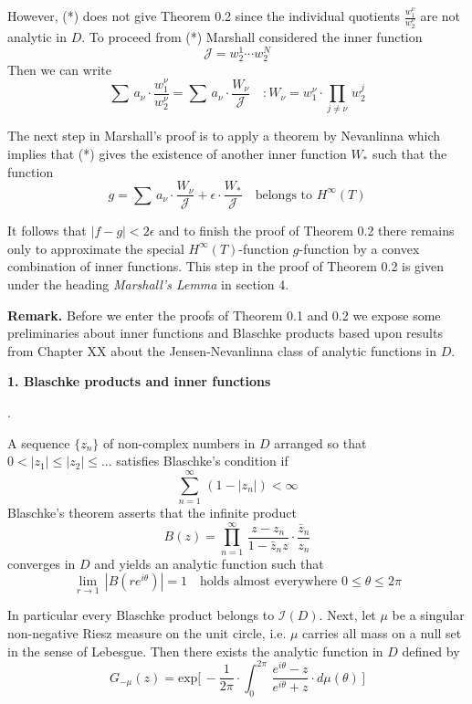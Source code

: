 \documentclass{amsart}
\def\vvv{-}
\begin{document}
\noindent
However,  (*) does not give Theorem 0.2
since the individual 
quotients $\frac{w_1^\nu}{w_2^\nu}$ are not analytic in $D$.
To proceed from (*) 
Marshall 
considered the inner function
\[ 
\mathcal J=w_2^1\cdots w_2^N
\]
Then we can write
\[
\sum\, a_\nu\cdot \frac{w_1^\nu}{w_2^\nu}=
\sum\, a_\nu\cdot \frac{W_\nu}{\mathcal J}\quad\colon
W_\nu=w_1^\nu\cdot\prod_{j\neq\nu}\, w_2^j\tag{**}
\]
\medskip

\noindent
The next step in Marshall's proof is to 
apply a theorem by Nevanlinna which implies that
(*)  gives the existence of another inner
function
$W_*$ such that the function 
\[
g=\sum\, a_\nu\cdot \frac{W_\nu}{\mathcal J}+
\epsilon\cdot\frac{W_*}{\mathcal J}\quad\text{belongs to}\,\, H^\infty(T)\tag{***}
\]


\noindent
It follows that
$\bigl|f-g\bigr|<2\epsilon$ and  to finish the proof
of Theorem 0.2 there  remains only to approximate the 
special $H^\infty(T)$-function
$g$-function by a convex combination 
of inner functions. This  step in  the proof of Theorem 0.2 
is given  under the heading \emph{Marshall's Lemma} in section 4.
\medskip

\noindent
{\bf Remark.} Before we enter the proofs of
Theorem 0.1 and 0.2 we  expose some preliminaries
about inner functions and Blaschke products based upon results from
Chapter XX about  the Jensen-Nevanlinna class of
analytic functions in $D$.

\newpage



\centerline {\bf 1. Blaschke products and inner functions}.
\medskip

\noindent
A sequence $\{z_n\}$ of non-complex numbers
in $D$ arranged so that
$0<|z_1|\leq|z_2|\leq ...$ 
satisfies
Blaschke's condition if
\[
\sum_{n=1}^\infty\, (1-|z_n|)<\infty
\]
Blaschke's theorem  asserts 
that the infinite product
\[
B(z)=\prod_{n=1}^\infty\,
\frac{z-z_n}{1-\bar z_n z}\cdot\frac{\bar z_n}{z_n}\tag{1}
\]
converges in $D$ and yields an analytic function such that
\medskip
\[
\lim_{r\to 1}\,
|B(re^{i\theta})|=1 \quad\text{holds  almost everywhere}\,\,
0\leq\theta\leq 2\pi
\]


\noindent
In particular every Blaschke product belongs to $\mathcal I(D)$.
Next, let
$\mu$ be a singular non-negative Riesz measure on the unit circle, i.e.
$\mu$ carries all mass on a null set in the sense of Lebesgue.
Then  there exists the analytic function in $D$ defined by
\[
G_{\vvv \mu}(z)= 
\text{exp}\bigl[\,-\frac{1}{2\pi}\cdot\int_0^{2\pi}\,
\frac{e^{i\theta}-z}{e^{i\theta}+z}\cdot d\mu(\theta)\,\bigr]\tag{2}
\]
\end{document}
